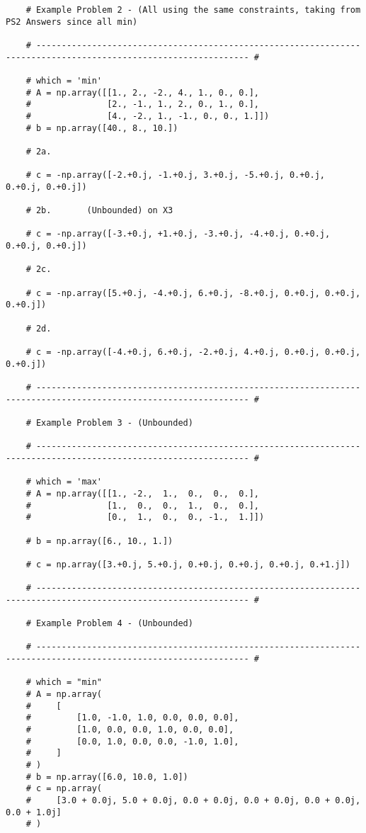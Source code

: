 \documentclass[letterpaper, a4paper]{article}
\begin{document}
\begin{verbatim}
    # Example Problem 2 - (All using the same constraints, taking from PS2 Answers since all min)

    # ---------------------------------------------------------------------------------------------------------------- #

    # which = 'min'
    # A = np.array([[1., 2., -2., 4., 1., 0., 0.],
    #               [2., -1., 1., 2., 0., 1., 0.],
    #               [4., -2., 1., -1., 0., 0., 1.]])
    # b = np.array([40., 8., 10.])

    # 2a.

    # c = -np.array([-2.+0.j, -1.+0.j, 3.+0.j, -5.+0.j, 0.+0.j, 0.+0.j, 0.+0.j])

    # 2b.       (Unbounded) on X3

    # c = -np.array([-3.+0.j, +1.+0.j, -3.+0.j, -4.+0.j, 0.+0.j, 0.+0.j, 0.+0.j])

    # 2c.

    # c = -np.array([5.+0.j, -4.+0.j, 6.+0.j, -8.+0.j, 0.+0.j, 0.+0.j, 0.+0.j])

    # 2d. 

    # c = -np.array([-4.+0.j, 6.+0.j, -2.+0.j, 4.+0.j, 0.+0.j, 0.+0.j, 0.+0.j])

    # ---------------------------------------------------------------------------------------------------------------- #

    # Example Problem 3 - (Unbounded)

    # ---------------------------------------------------------------------------------------------------------------- #

    # which = 'max'
    # A = np.array([[1., -2.,  1.,  0.,  0.,  0.],
    #               [1.,  0.,  0.,  1.,  0.,  0.],
    #               [0.,  1.,  0.,  0., -1.,  1.]])

    # b = np.array([6., 10., 1.])

    # c = np.array([3.+0.j, 5.+0.j, 0.+0.j, 0.+0.j, 0.+0.j, 0.+1.j])

    # ---------------------------------------------------------------------------------------------------------------- #

    # Example Problem 4 - (Unbounded)

    # ---------------------------------------------------------------------------------------------------------------- #

    # which = "min"
    # A = np.array(
    #     [
    #         [1.0, -1.0, 1.0, 0.0, 0.0, 0.0],
    #         [1.0, 0.0, 0.0, 1.0, 0.0, 0.0],
    #         [0.0, 1.0, 0.0, 0.0, -1.0, 1.0],
    #     ]
    # )
    # b = np.array([6.0, 10.0, 1.0])
    # c = np.array(
    #     [3.0 + 0.0j, 5.0 + 0.0j, 0.0 + 0.0j, 0.0 + 0.0j, 0.0 + 0.0j, 0.0 + 1.0j]
    # )


\end{verbatim}
\end{document}
